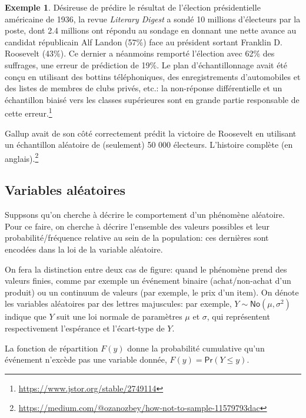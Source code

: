 \documentclass[
  11pt,
  letterpaper,
]{article}
\renewcommand{\href}[2]{#2\footnote{\url{#1}}}
\theoremstyle{definition}
\theoremstyle{definition}
\newtheorem{example}{Exemple}[section]
\theoremstyle{definition}
\theoremstyle{definition}
\theoremstyle{remark}
\begin{document}
\begin{example}
\protect\hypertarget{exm:Galluppoll}{}\label{exm:Galluppoll}Désireuse de prédire le résultat de l'élection présidentielle américaine de 1936, la revue \emph{Literary Digest} a sondé 10 millions d'électeurs par la poste, dont 2.4 millions ont répondu au sondage en donnant une nette avance au candidat républicain Alf Landon (57\%) face au président sortant Franklin D. Roosevelt (43\%). Ce dernier a néanmoins remporté l'élection avec 62\% des suffrages, une erreur de prédiction de 19\%. Le plan d'échantillonnage avait été conçu en utilisant des bottins téléphoniques, des enregistrements d'automobiles et des listes de membres de clubs privés, etc.: \href{https://www.jstor.org/stable/2749114}{la non-réponse différentielle et un échantillon biaisé vers les classes supérieures sont en grande partie responsable de cette erreur.}

Gallup avait de son côté correctement prédit la victoire de Roosevelt en utilisant un échantillon aléatoire de (seulement) 50 000 électeurs. \href{https://medium.com/@ozanozbey/how-not-to-sample-11579793dac}{L'histoire complète (en anglais).}
\end{example}

\hypertarget{variable-aleatoire}{%
\subsection{Variables aléatoires}\label{variable-aleatoire}}

Suppsons qu'on cherche à décrire le comportement d'un phénomène aléatoire. Pour ce faire, on cherche à décrire l'ensemble des valeurs possibles et leur probabilité/fréquence relative au sein de la population: ces dernières sont encodées dans la loi de la variable aléatoire.

On fera la distinction entre deux cas de figure: quand le phénomène prend des valeurs finies, comme par exemple un événement binaire (achat/non-achat d'un produit) ou un continuum de valeurs (par exemple, le prix d'un item). On dénote les variables aléatoires par des lettres majuscules: par exemple, \(Y \sim \mathsf{No}(\mu, \sigma^2)\) indique que \(Y\) suit une loi normale de paramètres \(\mu\) et \(\sigma\), qui représentent respectivement l'espérance et l'écart-type de \(Y\).

La fonction de répartition \(F(y)\) donne la probabilité cumulative qu'un événement n'excède pas une variable donnée, \(F(y) = \mathsf{Pr}(Y \leq y)\).
\end{document}
